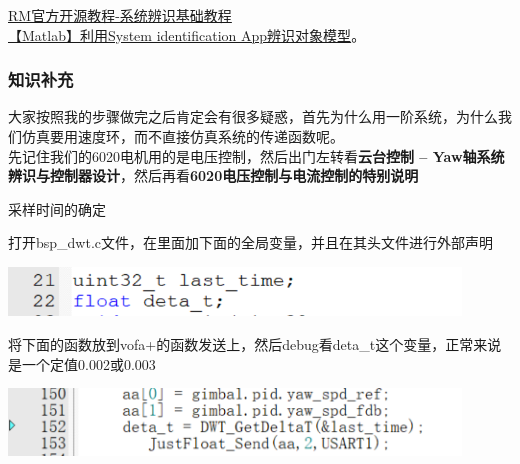 \documentclass[UTF8,a4paper,12pt]{ctexart}
\begin{document}
    \href{https://bbs.robomaster.com/wiki/4574/3559}{RM官方开源教程-系统辨识基础教程}
    \\\href{ https://blog.csdn.net/xiaohejiaoyiya/article/details/105958551?ops_request_misc=%257B%2522request%255Fid%2522%253A%2522d515a96088d8f99093ec8d0b4cb80d62%2522%252C%2522scm%2522%253A%252220140713.130102334.pc%255Fall.%2522%257D&request_id=d515a96088d8f99093ec8d0b4cb80d62&biz_id=0&utm_medium=distribute.pc_search_result.none-task-blog-2~all~first_rank_ecpm_v1~rank_v31_ecpm-1-105958551-null-null.142^v100^pc_search_result_base1&utm_term=%E5%88%A9%E7%94%A8system%20identification%E7%A1%AE%E8%AE%A4%E6%A8%A1%E5%9E%8B&spm=1018.2226.3001.4187}{【Matlab】利用System identification App辨识对象模型}。
    \subsubsection{知识补充}
    \begin{flushleft}
      大家按照我的步骤做完之后肯定会有很多疑惑，首先为什么用一阶系统，为什么我们仿真要用速度环，而不直接仿真系统的传递函数呢。
      \\先记住我们的6020电机用的是电压控制，然后出门左转看\textbf{云台控制 -- Yaw轴系统辨识与控制器设计}，然后再看\textbf{6020电压控制与电流控制的特别说明}
    \end{flushleft}
    \begin{titlebox}{采样时间的确定}
      \begin{flushleft}
         打开bsp\_dwt.c文件，在里面加下面的全局变量，并且在其头文件进行外部声明
      \end{flushleft}
      \par \includegraphics[width=12cm]{picture/variable.png}
      \\
      \begin{flushleft}
        将下面的函数放到vofa+的函数发送上，然后debug看deta\_t这个变量，正常来说是一个定值0.002或0.003
        \par \includegraphics[width=12cm]{picture/variable_1.png}
      \end{flushleft}
    \end{titlebox}
    
\end{document}
